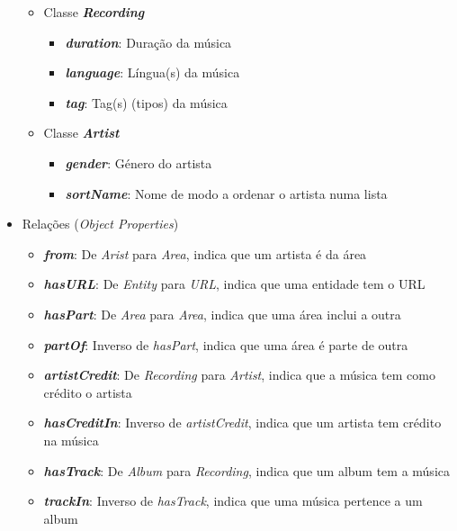 \documentclass{article}
\begin{document}
\begin{itemize}
\begin{itemize}
\begin{itemize}
        \end{itemize}
        \item Classe \textbf{\textit{Recording}}
        \begin{itemize}
            \item \textbf{\textit{duration}}: Duração da música
            \item \textbf{\textit{language}}: Língua(s) da música
            \item \textbf{\textit{tag}}: Tag(s) (tipos) da música
        \end{itemize}
        \item Classe \textbf{\textit{Artist}}
        \begin{itemize}
            \item \textbf{\textit{gender}}: Género do artista
            \item \textbf{\textit{sortName}}: Nome de modo a ordenar o artista numa lista
        \end{itemize}
    \end{itemize}
    \item Relações (\textit{Object Properties})
    \begin{itemize}
        \item \textbf{\textit{from}}: De \textit{Arist} para \textit{Area}, indica que um artista é da área
        \item \textbf{\textit{hasURL}}: De \textit{Entity} para \textit{URL}, indica que uma entidade tem o URL
        \item \textbf{\textit{hasPart}}: De \textit{Area} para \textit{Area}, indica que uma área inclui a outra
        \item \textbf{\textit{partOf}}: Inverso de \textit{hasPart}, indica que uma área é parte de outra
        \item \textbf{\textit{artistCredit}}: De \textit{Recording} para \textit{Artist}, indica que a música tem como crédito o artista
        \item \textbf{\textit{hasCreditIn}}: Inverso de \textit{artistCredit}, indica que um artista tem crédito na música
        \item \textbf{\textit{hasTrack}}: De \textit{Album} para \textit{Recording}, indica que um album tem a música
        \item \textbf{\textit{trackIn}}: Inverso de \textit{hasTrack}, indica que uma música pertence a um album
    \end{itemize}
\end{itemize}
\end{document}
